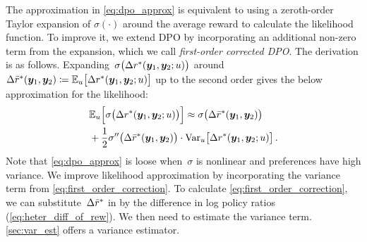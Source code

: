The approximation in \cref{eq:dpo_approx} is equivalent to using a zeroth-order Taylor expansion of $\sigma(\cdot)$ around the average reward to calculate the likelihood function. To improve it, we extend DPO by incorporating an additional non-zero term from the expansion, which we call \emph{first-order corrected DPO}. The derivation is as follows. Expanding~$\sigma\big(\Delta r^*({\bm{y}}_1, {\bm{y}}_2; u)\big)$ around~$\Delta{\bar{r}}^*({\bm{y}}_1, {\bm{y}}_2) \coloneqq \mathbb{E}_u\big[\Delta r^*({\bm{y}}_1, {\bm{y}}_2; u)\big]$ up to the second order gives
the below approximation for the likelihood:
%
\begin{equation}
\begin{aligned}
\label{eq:first_order_correction} 
    &\mathbb{E}_u\Big[\sigma\big(\Delta r^*({\bm{y}}_1, {\bm{y}}_2; u)\big)\Big] \approx \sigma\big(\Delta{\bar{r}}^*({\bm{y}}_1, {\bm{y}}_2)\big) \\
    &+ \frac{1}{2} \sigma''\big(\Delta{\bar{r}}^*({\bm{y}}_1, {\bm{y}}_2)\big) \cdot \mathrm{Var}_u\big[\Delta r^*({\bm{y}}_1, {\bm{y}}_2; u)\big]
    \,.
\end{aligned}
\end{equation}
%
Note that \cref{eq:dpo_approx} is loose when~$\sigma$ is nonlinear and preferences have high variance. We improve likelihood approximation by incorporating the variance term from \cref{eq:first_order_correction}.
To calculate \cref{eq:first_order_correction}, we can substitute~$\Delta {\bar{r}}^*$ in by the difference in log policy ratios (\cref{eq:heter_diff_of_rew}). We then need to estimate the variance term. \cref{sec:var_est} offers a variance estimator. 

